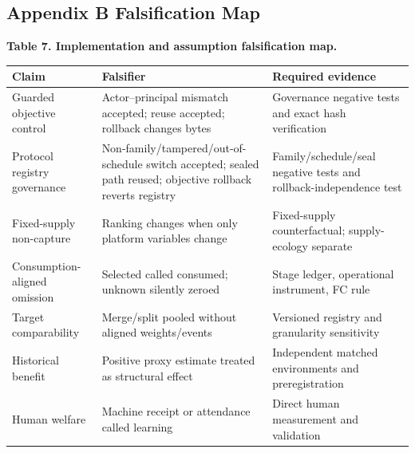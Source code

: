 \documentclass[
  11pt]{article}
\begin{document}
\subsection{Appendix B Falsification
Map}\label{appendix-b-falsification-map}

\textbf{Table 7. Implementation and assumption falsification map.}

\begin{longtable}[]{@{}
  >{\raggedright\arraybackslash}p{}
  >{\raggedright\arraybackslash}p{}
  >{\raggedright\arraybackslash}p{}@{}}
\toprule\noalign{}
\begin{minipage}[b]{\linewidth}\raggedright
Claim
\end{minipage} & \begin{minipage}[b]{\linewidth}\raggedright
Falsifier
\end{minipage} & \begin{minipage}[b]{\linewidth}\raggedright
Required evidence
\end{minipage} \\
\midrule\noalign{}
\endhead
\bottomrule\noalign{}
\endlastfoot
Guarded objective control & Actor--principal mismatch accepted; reuse
accepted; rollback changes bytes & Governance negative tests and exact
hash verification \\
Protocol registry governance & Non-family/tampered/out-of-schedule
switch accepted; sealed path reused; objective rollback reverts registry
& Family/schedule/seal negative tests and rollback-independence test \\
Fixed-supply non-capture & Ranking changes when only platform variables
change & Fixed-supply counterfactual; supply-ecology separate \\
Consumption-aligned omission & Selected called consumed; unknown
silently zeroed & Stage ledger, operational instrument, FC rule \\
Target comparability & Merge/split pooled without aligned weights/events
& Versioned registry and granularity sensitivity \\
Historical benefit & Positive proxy estimate treated as structural
effect & Independent matched environments and preregistration \\
Human welfare & Machine receipt or attendance called learning & Direct
human measurement and validation \\
\end{longtable}
\end{document}
